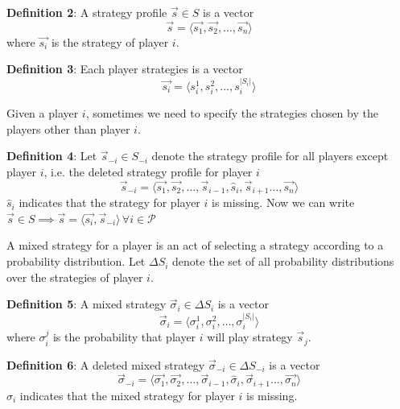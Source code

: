 \documentclass[conference]{IEEEtran}
\begin{document}
\textbf{Definition 2}: A strategy profile $\vec{s} \in S$ is a vector $$\vec{s} = \langle\vec{s_1}, \vec{s_2}, \ldots, \vec{s_n}\rangle$$ where $\vec{s_i}$ is the strategy of player $i$.

\textbf{Definition 3}: Each player strategies is a vector $$\vec{s_i} = \langle s_i^1, s_i^2, \ldots, s_i^{|S_i|}\rangle$$ 
\par Given a player $i$, sometimes we need to specify the strategies chosen by the players other than player $i$. 

\textbf{Definition 4}: Let $\vec{s}_{-i} \in S_{-i}$ denote the strategy profile for all players except player $i$, i.e. the deleted strategy profile for player $i$
$$\vec{s}_{-i} = \langle \vec{s_1}, \vec{s_2}, \ldots, \vec{s}_{i-1}, \hat{s}_{i}, \vec{s}_{i+1} \ldots, \vec{s_n}\rangle$$ $\hat{s}_{i}$ indicates that the strategy for player $i$ is missing.
Now we can write $\vec{s} \in S \implies \vec{s} = \langle \vec{s_i}, \vec{s}_{-i} \rangle \, \forall i \in \mathcal{P} $

\par A mixed strategy for a player is an act of selecting a strategy according to a probability distribution. Let $\Delta S_i$ denote the set of all probability distributions over the strategies of player $i$.

\textbf{Definition 5}: A mixed strategy $\vec{\sigma}_i \in \Delta S_i$ is a vector $$\vec{\sigma}_i = \langle\sigma_i^1, \sigma_i^2, \ldots, \sigma_i^{|S_i|}\rangle$$ where $\sigma_i^j$ is the probability that player $i$ will play strategy $\vec{s}_j$.

\textbf{Definition 6}: A deleted mixed strategy $\vec{\sigma}_{-i} \in \Delta S_{-i}$ is a vector $$\vec{\sigma}_{-i} = \langle \vec{\sigma_1}, \vec{\sigma_2}, \ldots, \vec{\sigma}_{i-1}, \hat{\sigma}_{i}, \vec{\sigma}_{i+1} \ldots, \vec{\sigma_n}\rangle$$ $\hat{\sigma}_{i}$ indicates that the mixed strategy for player $i$ is missing.
\end{document}
